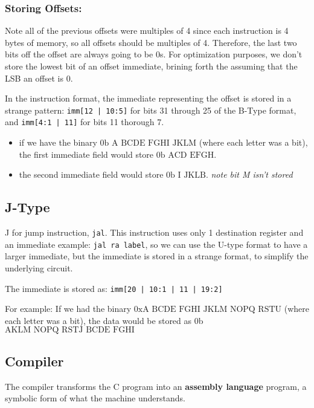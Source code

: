 \documentclass[12pt]{article}
\begin{document}
\subsubsection*{Storing Offsets:}
Note all of the previous offsets were multiples of 4 since each instruction is 4 bytes of memory, so all offsets should be multiples of 4. Therefore, the last two bits off the offset are always going to be 0s. For optimization purposes, we don't store the lowest bit of an offset immediate, brining forth the assuming that the LSB an offset is 0.

In the instruction format, the immediate representing the offset is stored in a strange pattern:
\lstinline{imm[12 | 10:5]}  for bits 31 through 25 of the B-Type format, and \lstinline{imm[4:1 | 11]} for bits 11 thorough 7.
\begin{itemize}
    \item if we have the binary $\text{0b A BCDE FGHI JKLM}$ (where each letter was a bit), the first immediate field would store $\text{0b ACD EFGH}$.
    \item the second immediate field would store $\text{0b I JKLB}$. \emph{note bit M isn't stored}
\end{itemize}



\subsection*{J-Type}
J for jump instruction, \lstinline{jal}. This instruction uses only 1 destination register and an immediate example: \lstinline{jal ra label}, so we can use the U-type format to have a larger immediate, but the immediate is stored in a strange format, to simplify the underlying circuit.

The immediate is stored as: \lstinline{imm[20 | 10:1 | 11 | 19:2]}

For example: If we had the binary $\text{0xA BCDE FGHI JKLM NOPQ RSTU}$ (where each letter was a bit), the data would be stored as 0b $\text{AKLM NOPQ RSTJ BCDE FGHI}$



\subsection*{Compiler}
The compiler transforms the C program into an \textbf{assembly language} program, a symbolic form of what the machine understands.
\end{document}
